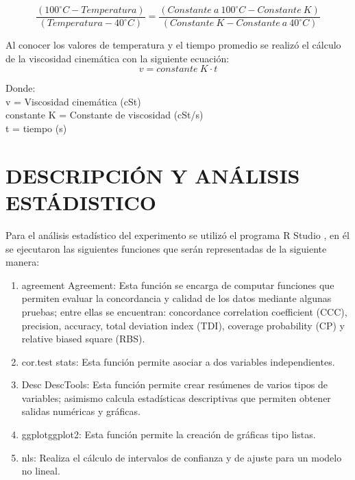 \documentclass[12, letterpaper]{article}
\begin{document}
\begin{equation}
\label{ec3}
\frac{(100^{\circ}C - Temperatura)}{(Temperatura - 40^{\circ}C)} = \frac{(Constante \> a \> 100^{\circ}C -Constante \> K)}{(Constante \> K - Constante \> a \> 40^{\circ}C)}
\end{equation}

Al conocer los valores de temperatura y el tiempo promedio se realizó el cálculo de la viscosidad cinemática con la siguiente ecuación:
\begin{equation}
\label{ec4}
v = constante \> K\cdot t
\end{equation}
 
Donde:\\ 
v = Viscosidad cinemática (cSt)\\
constante K = Constante de viscosidad (cSt/s)\\ 
t = tiempo (s)

\section{DESCRIPCIÓN Y ANÁLISIS ESTÁDISTICO}

Para el análisis estadístico del experimento se utilizó el programa R Studio \cite{rstudio}, en él se ejecutaron las siguientes funciones que serán representadas de la siguiente manera:

\begin{enumerate}
    \item agreement {Agreement}: Esta función se encarga de computar funciones que permiten evaluar la concordancia y calidad de los datos mediante algunas pruebas; entre ellas se encuentran: concordance correlation coefficient (CCC), precision, accuracy, total deviation index (TDI), coverage probability (CP) y relative biased square (RBS).
    \item cor.test {stats}: Esta función permite asociar a dos variables independientes.
    \item Desc {DescTools}: Esta función permite crear resúmenes de varios tipos de variables; asimismo calcula estadísticas descriptivas que permiten obtener salidas numéricas y gráficas.
    \item ggplot{ggplot2}: Esta función permite la creación de gráficas tipo listas.
    \item nls: Realiza el cálculo de intervalos de confianza y de ajuste para un modelo no lineal.
\end{enumerate}
\end{document}
